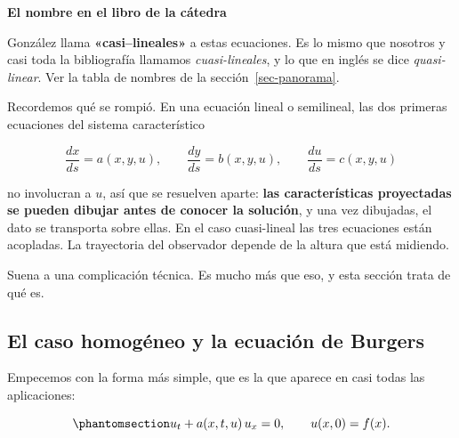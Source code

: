 \documentclass[
  spanish,
  a4paper,
]{scrbook}
\theoremstyle{definition}
\theoremstyle{plain}
\theoremstyle{definition}
\theoremstyle{plain}
\theoremstyle{definition}
\theoremstyle{remark}
\begin{document}
\begin{tcolorbox}[enhanced jigsaw, arc=.35mm, bottomrule=.15mm, breakable, colback=white, colframe=quarto-callout-warning-color-frame, left=2mm, leftrule=.75mm, opacityback=0, rightrule=.15mm, toprule=.15mm]
\begin{minipage}[t]{5.5mm}
\textcolor{quarto-callout-warning-color}{\faExclamationTriangle}
\end{minipage}%
\begin{minipage}[t]{\textwidth - 5.5mm}

\vspace{-3mm}\textbf{El nombre en el libro de la cátedra}\vspace{3mm}

González llama \textbf{«casi--lineales»} a estas ecuaciones. Es lo mismo
que nosotros y casi toda la bibliografía llamamos \emph{cuasi-lineales},
y lo que en inglés se dice \emph{quasi-linear}. Ver la tabla de nombres
de la sección~\ref{sec-panorama}.

\end{minipage}%
\end{tcolorbox}

Recordemos qué se rompió. En una ecuación lineal o semilineal, las dos
primeras ecuaciones del sistema característico

\[
\frac{dx}{ds} = a(x,y,u), \qquad \frac{dy}{ds} = b(x,y,u), \qquad \frac{du}{ds} = c(x,y,u)
\]

no involucran a \(u\), así que se resuelven aparte: \textbf{las
características proyectadas se pueden dibujar antes de conocer la
solución}, y una vez dibujadas, el dato se transporta sobre ellas. En el
caso cuasi-lineal las tres ecuaciones están acopladas. La trayectoria
del observador depende de la altura que está midiendo.

Suena a una complicación técnica. Es mucho más que eso, y esta sección
trata de qué es.

\subsection{El caso homogéneo y la ecuación de
Burgers}\label{sec-burgers}

Empecemos con la forma más simple, que es la que aparece en casi todas
las aplicaciones:

\begin{equation}\protect\phantomsection\label{eq-cuasi-homogenea}{
u_t + a(x,t,u)\,u_x = 0, \qquad u(x,0) = f(x).
}\end{equation}
\end{document}
